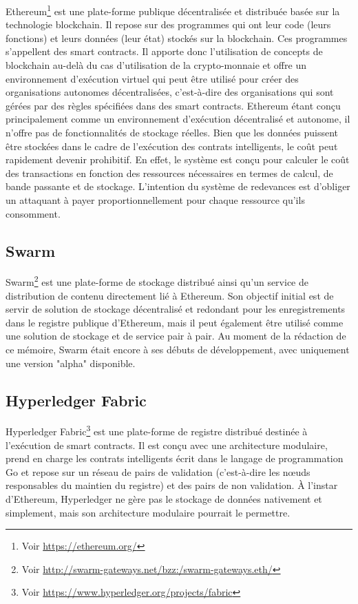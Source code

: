 \documentclass{tnreport}
\begin{document}
Ethereum\footnote{Voir \url{https://ethereum.org/}} est une plate-forme publique décentralisée et distribuée basée sur la technologie blockchain. Il repose sur des programmes qui ont leur code (leurs fonctions) et leurs données (leur état) stockés sur la blockchain. Ces programmes s'appellent des smart contracts. 
Il apporte donc l'utilisation de concepts de blockchain au-delà du cas d'utilisation de la crypto-monnaie et offre un environnement d'exécution virtuel qui peut être utilisé pour créer des organisations autonomes décentralisées, c'est-à-dire des organisations qui sont gérées par des règles spécifiées dans des smart contracts. Ethereum étant conçu principalement comme un environnement d'exécution décentralisé et autonome, il n'offre pas de fonctionnalités de stockage réelles. Bien que les données puissent être stockées dans le cadre de l'exécution des contrats intelligents, le coût peut rapidement devenir prohibitif. En effet, le système est conçu pour calculer le coût des transactions en fonction des ressources nécessaires en termes de calcul, de bande passante et de stockage. L'intention du système de redevances est d'obliger un attaquant à payer proportionnellement pour chaque ressource qu'ils consomment.

\subsection{Swarm}

Swarm\footnote{Voir \url{http://swarm-gateways.net/bzz:/swarm-gateways.eth/}} est une plate-forme de stockage distribué ainsi qu'un service de distribution de contenu directement lié à Ethereum. Son objectif initial est de servir de solution de stockage décentralisé et redondant pour les enregistrements dans le registre publique d'Ethereum, mais il peut également être utilisé comme une solution de stockage et de service pair à pair. Au moment de la rédaction de ce mémoire, Swarm était encore à ses débuts de développement, avec uniquement une version "alpha" disponible.

\subsection{Hyperledger Fabric}

Hyperledger Fabric\footnote{Voir \url{https://www.hyperledger.org/projects/fabric}} est une plate-forme de registre distribué destinée à l'exécution de smart contracts. Il est conçu avec une architecture modulaire, prend en charge les contrats intelligents écrit dans le langage de programmation Go et repose sur un réseau de pairs de validation (c'est-à-dire les nœuds responsables du maintien du registre) et des pairs de non validation. À l'instar d'Ethereum, Hyperledger ne gère pas le stockage de données nativement et simplement, mais son architecture modulaire pourrait le permettre.
\end{document}
